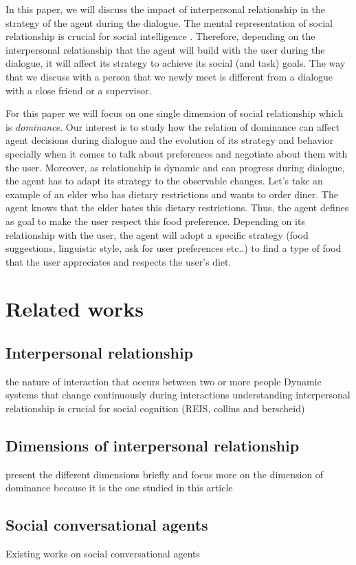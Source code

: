 \documentclass{llncs}
\begin{document}
In this paper, we will discuss the impact of interpersonal relationship in the strategy of the agent during the dialogue. The mental representation of social relationship is crucial for social intelligence \cite{haslam1994mental}. Therefore, depending on the interpersonal relationship that the agent will build with the user during the dialogue, it will affect its strategy to achieve its social (and task) goals. The way that we discuss with a person that we newly meet is different from a dialogue with a close friend or a supervisor. 
\par For this paper we will focus on one single dimension of social relationship which is \textit{dominance}. Our interest is to study how the relation of dominance can affect agent decisions during dialogue and the evolution of its strategy and behavior specially when it comes to talk about preferences and negotiate about them with the user. Moreover, as relationship is dynamic and can progress during dialogue, the agent has to adapt its strategy to the observable changes. Let's take an example of an elder  who has dietary restrictions and wants to order diner. The agent knows that the elder hates this dietary restrictions. Thus, the agent defines as goal to make the user respect this food preference. Depending on its relationship with the user, the agent will adopt a specific strategy (food suggestions, linguistic style, ask for user preferences etc..) to find a type of food that the user appreciates and respects the user's diet.



\section{Related works}
\subsection{Interpersonal relationship}
the nature of interaction that occurs between two or more people
Dynamic systems that change continuously  during interactions
understanding interpersonal relationship is crucial for social cognition (REIS, collins and berscheid)


\subsection{Dimensions of interpersonal relationship}
present the different dimensions briefly and focus more on the dimension of dominance because it is the one studied in this article
\subsection{Social conversational agents}
 Existing works on social conversational agents
\noindent 
\vskip 4pt


\end{document}
